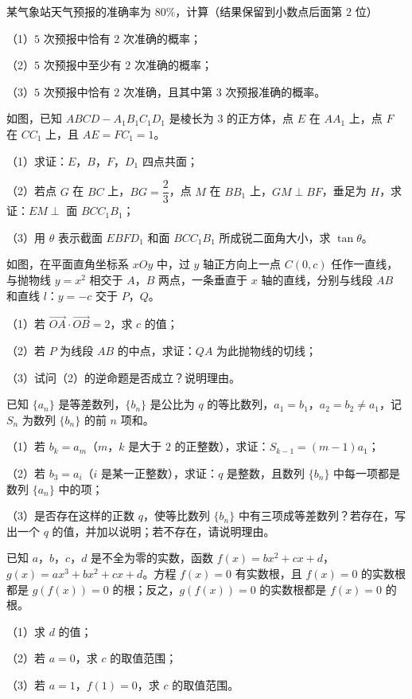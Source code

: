 \begin{question}
某气象站天气预报的准确率为 $80\%$，计算（结果保留到小数点后面第 $2$ 位）

（1）$5$ 次预报中恰有 $2$ 次准确的概率；

（2）$5$ 次预报中至少有 $2$ 次准确的概率；

（3）$5$ 次预报中恰有 $2$ 次准确，且其中第 $3$ 次预报准确的概率。

\Needspace{0.4\textheight}
\end{question}
\begin{question}
如图，已知 $ABCD-A_1B_1C_1D_1$ 是棱长为 $3$ 的正方体，点 $E$ 在 $AA_1$ 上，点 $F$ 在 $CC_1$ 上，且 $AE=FC_1=1$。

（1）求证：$E$，$B$，$F$，$D_1$ 四点共面；

（2）若点 $G$ 在 $BC$ 上，$BG=\dfrac23$，点 $M$ 在 $BB_1$ 上，$GM\perp BF$，垂足为 $H$，求证：$EM\perp$ 面 $BCC_1B_1$；

（3）用 $\theta$ 表示截面 $EBFD_1$ 和面 $BCC_1B_1$ 所成锐二面角大小，求 $\tan\theta$。
\nopagebreak[4]
\begin{center}\end{center}
\nopagebreak[4]
\Needspace{0.4\textheight}
\end{question}
\begin{question}
如图，在平面直角坐标系 $xOy$ 中，过 $y$ 轴正方向上一点 $C(0,c)$ 任作一直线，与抛物线 $y=x^2$ 相交于 $A$，$B$ 两点，一条垂直于 $x$ 轴的直线，分别与线段 $AB$ 和直线 $l$：$y=-c$ 交于 $P$，$Q$。

（1）若 $\overrightarrow{OA}\cdot\overrightarrow{OB}=2$，求 $c$ 的值；

（2）若 $P$ 为线段 $AB$ 的中点，求证：$QA$ 为此抛物线的切线；

（3）试问（2）的逆命题是否成立？说明理由。
\nopagebreak[4]
\begin{center}\end{center}
\nopagebreak[4]
\end{question}
\begin{question}
已知 $\{a_n\}$ 是等差数列，$\{b_n\}$ 是公比为 $q$ 的等比数列，$a_1=b_1$，$a_2=b_2\neq a_1$，记 $S_n$ 为数列 $\{b_n\}$ 的前 $n$ 项和。

（1）若 $b_k=a_m$（$m$，$k$ 是大于 $2$ 的正整数），求证：$S_{k-1}=(m-1)a_1$；

（2）若 $b_3=a_i$（$i$ 是某一正整数），求证：$q$ 是整数，且数列 $\{b_n\}$ 中每一项都是数列 $\{a_n\}$ 中的项；

（3）是否存在这样的正数 $q$，使等比数列 $\{b_n\}$ 中有三项成等差数列？若存在，写出一个 $q$ 的值，并加以说明；若不存在，请说明理由。

\end{question}
\begin{question}
已知 $a$，$b$，$c$，$d$ 是不全为零的实数，函数 $f(x)=bx^2+cx+d$，$g(x)=ax^3+bx^2+cx+d$。方程 $f(x)=0$ 有实数根，且 $f(x)=0$ 的实数根都是 $g(f(x))=0$ 的根；反之，$g(f(x))=0$ 的实数根都是 $f(x)=0$ 的根。

（1）求 $d$ 的值；

（2）若 $a=0$，求 $c$ 的取值范围；

（3）若 $a=1$，$f(1)=0$，求 $c$ 的取值范围。

\end{question}